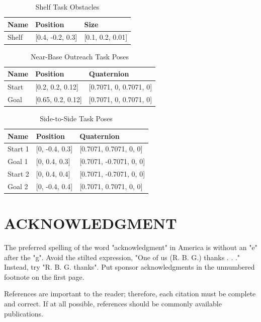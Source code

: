 \documentclass[letterpaper, 10 pt, conference]{ieeeconf}  %
\begin{document}
\begin{table}[H]
    \centering
    \caption{Shelf Task Obstacles}
    \label{tab:simpleShelfObstacles}
    \begin{tabular}{lll}
    \hline
    \textbf{Name} & \textbf{Position} & \textbf{Size} \\
    \hline
    Shelf & [0.4, -0.2, 0.3] & [0.1, 0.2, 0.01] \\
    \hline
    \end{tabular}
\end{table}

\begin{table}[H]
    \centering
    \caption{Near-Base Outreach Task Poses}
    \label{tab:outreachPoses}
    \begin{tabular}{lll}
    \hline
    \textbf{Name} & \textbf{Position} & \textbf{Quaternion} \\
    \hline
    Start & [0.2, 0.2, 0.12] & [0.7071, 0, 0.7071, 0] \\
    Goal & [0.65, 0.2, 0.12] & [0.7071, 0, 0.7071, 0] \\
    \hline
    \end{tabular}
\end{table}

\begin{table}[H]
    \centering
    \caption{Side-to-Side Task Poses}
    \label{tab:sideToSidePoses}
    \begin{tabular}{lll}
    \hline
    \textbf{Name} & \textbf{Position} & \textbf{Quaternion} \\
    \hline
    Start 1 & [0, -0.4, 0.3] & [0.7071, 0.7071, 0, 0] \\
    Goal 1 & [0, 0.4, 0.3] & [0.7071, -0.7071, 0, 0] \\
    Start 2 & [0, 0.4, 0.4] & [0.7071, -0.7071, 0, 0] \\
    Goal 2 & [0, -0.4, 0.4] & [0.7071, 0.7071, 0, 0] \\
    \hline
    \end{tabular}
\end{table}

\section*{ACKNOWLEDGMENT}

The preferred spelling of the word "acknowledgment" in America is without an "e" after the "g". Avoid the stilted expression, "One of us (R. B. G.) thanks . . ."  Instead, try "R. B. G. thanks". Put sponsor acknowledgments in the unnumbered footnote on the first page.




References are important to the reader; therefore, each citation must be complete and correct. If at all possible, references should be commonly available publications.





\end{document}
